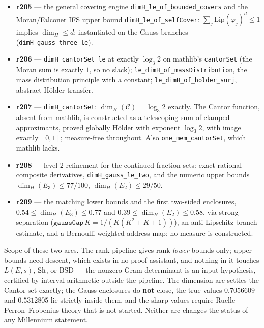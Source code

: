 \begin{itemize}
through the universal machine from the committed regulator certificates
(\texttt{E389a1\_rank\_ge\_two\_universal},
\texttt{E5077a1\_rank\_ge\_three\_universal}); the universal and per-curve
canonical heights are definitionally equal, \texttt{canheightW\_eq\_389}
closing by \texttt{rfl}.
\item \textbf{r205} --- the general covering engine
\texttt{dimH\_le\_of\_bounded\_covers} and the Moran/Falconer IFS upper bound
\texttt{dimH\_le\_of\_selfCover}: $\sum_j \mathrm{Lip}(\varphi_j)^d \le 1$
implies $\dim_H \le d$; instantiated on the Gauss branches
(\texttt{dimH\_gauss\_three\_le}).
\item \textbf{r206} --- \texttt{dimH\_cantorSet\_le} at exactly $\log_3 2$ on
mathlib's \texttt{cantorSet} (the Moran sum is exactly $1$, so no slack);
\texttt{le\_dimH\_of\_massDistribution}, the mass distribution principle with
a constant; \texttt{le\_dimH\_of\_holder\_surj}, abstract H\"older transfer.
\item \textbf{r207} --- \texttt{dimH\_cantorSet}:
$\dim_H(\mathcal{C}) = \log_3 2$ exactly. The Cantor function, absent from
mathlib, is constructed as a telescoping sum of clamped approximants, proved
globally H\"older with exponent $\log_3 2$, with image exactly $[0,1]$;
measure-free throughout. Also \texttt{one\_mem\_cantorSet}, which mathlib
lacks.
\item \textbf{r208} --- level-2 refinement for the continued-fraction sets:
exact rational composite derivatives, \texttt{dimH\_gauss\_le\_two}, and the
numeric upper bounds $\dim_H(E_3)\le 77/100$, $\dim_H(E_2)\le 29/50$.
\item \textbf{r209} --- the matching lower bounds and the first two-sided
enclosures, $0.54 \le \dim_H(E_3) \le 0.77$ and
$0.39 \le \dim_H(E_2) \le 0.58$, via strong separation
($\texttt{gaussGap}\,K = 1/(K(K^2{+}K{+}1))$), an anti-Lipschitz branch
estimate, and a Bernoulli weighted-address map; no measure is constructed.
\end{itemize}
\noindent Scope of these two arcs. The rank pipeline gives rank \emph{lower}
bounds only; upper bounds need descent, which exists in no proof assistant,
and nothing in it touches $L(E,s)$, $\mathrm{Sh}$, or BSD --- the nonzero Gram
determinant is an input hypothesis, certified by interval arithmetic outside
the pipeline. The dimension arc settles the Cantor set exactly; the Gauss
enclosures do \textbf{not} close, the true values $0.7056609$ and $0.5312805$
lie strictly inside them, and the sharp values require
Ruelle--Perron--Frobenius theory that is not started. Neither arc changes the
status of any Millennium statement.

